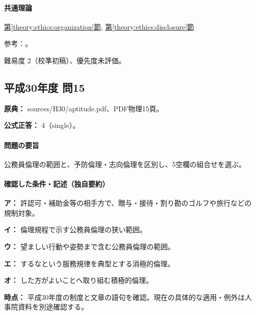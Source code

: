 \paragraph{共通理論} \hyperref[theory:ethics:organization]{第\ref*{theory:ethics:organization}節}, \hyperref[theory:ethics:disclosure]{第\ref*{theory:ethics:disclosure}節}

\par 参考：\cite{ipej_ethics2023,scj_code2013}。

\par 難易度 2（校準初稿）、優先度未評価。

\subsection{平成30年度 問15}
\label{q:h30-reg-apt-15}

\noindent\textbf{原典：} sources/H30/aptitude.pdf、PDF物理15頁。

\textbf{公式正答：} 4（single）。

\paragraph{問題の要旨} 公務員倫理の範囲と、予防倫理・志向倫理を区別し、5空欄の組合せを選ぶ。

\paragraph{確認した条件・記述（独自要約）}\mbox{}\par

\noindent\textbf{ア：} 許認可・補助金等の相手方で、贈与・接待・割り勘のゴルフや旅行などの規制対象。\par

\noindent\textbf{イ：} 倫理規程で示す公務員倫理の狭い範囲。\par

\noindent\textbf{ウ：} 望ましい行動や姿勢まで含む公務員倫理の範囲。\par

\noindent\textbf{エ：} するなという服務規律を典型とする消極的倫理。\par

\noindent\textbf{オ：} した方がよいことへ取り組む積極的倫理。\par

\noindent\textbf{時点：} 平成30年度の制度と文章の語句を確認。現在の具体的な適用・例外は人事院資料を別途確認する。\par

